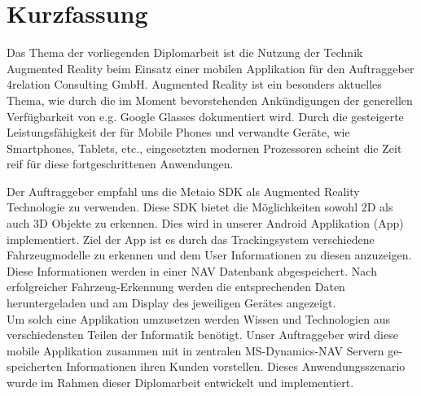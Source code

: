 \chapter*{Kurzfassung}

Das Thema der vorliegenden Diplomarbeit ist die Nutzung der Technik Augmented Reality beim Einsatz einer mobilen Applikation f{\"u}r den Auftraggeber 4relation Consulting GmbH.
Augmented Reality ist ein besonders aktuelles Thema, wie durch die im Moment bevorstehenden Ank{\"u}ndigungen der generellen Verf{\"u}gbarkeit von e.g. Google Glasses dokumentiert wird. Durch die gesteigerte Leistungsf{\"a}higkeit der f{\"u}r Mobile Phones und verwandte Ger{\"a}te, wie Smartphones, Tablets, etc., eingesetzten modernen Prozessoren scheint die Zeit reif f{\"u}r diese fortgeschrittenen Anwendungen.

Der Auftraggeber empfahl uns die Metaio SDK als Augmented Reality Technologie zu verwenden. Diese SDK bietet die M{\"o}glichkeiten sowohl 2D als auch 3D Objekte zu erkennen. Dies wird in unserer Android Applikation (App) implementiert. Ziel der App ist es durch das Trackingsystem verschiedene Fahrzeugmodelle zu erkennen und dem User Informationen zu diesen anzuzeigen. Diese Informationen werden in einer NAV Datenbank abgespeichert. Nach erfolgreicher Fahrzeug-Erkennung werden die entsprechenden Daten heruntergeladen und am Display des jeweiligen Ger{\"a}tes angezeigt.\\
Um solch eine Applikation umzusetzen werden Wissen und Technologien aus verschiedensten Teilen der Informatik ben{\"o}tigt. Unser Auftraggeber wird diese mobile Applikation zusammen mit in zentralen MS-Dynamics-NAV Servern ge-speicherten Informationen ihren Kunden vorstellen. Dieses Anwendungsszenario wurde im Rahmen dieser Diplomarbeit entwickelt und implementiert.